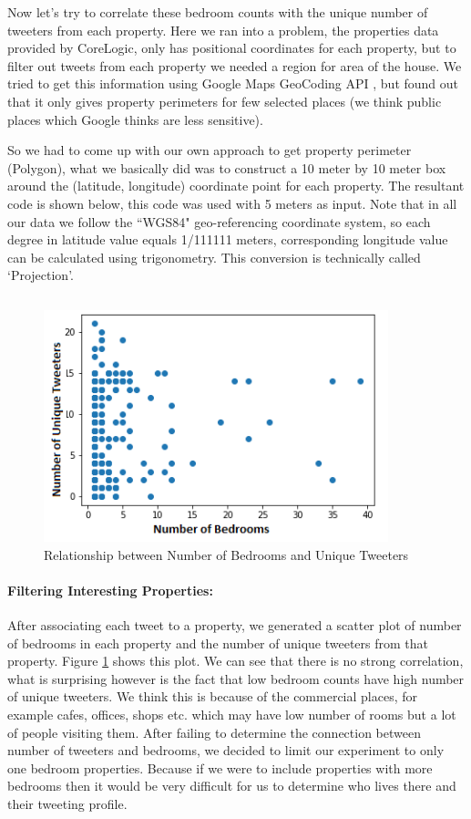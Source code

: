 \documentclass[12pt]{report}
\theoremstyle{named}
\begin{document}
Now let's try to correlate these bedroom counts with the unique number of tweeters from each property. Here we ran into a problem, the properties data provided by CoreLogic, only has positional coordinates for each property, but to filter out tweets from each property we needed a region for area of the house. We tried to get this information using Google Maps GeoCoding API \cite{GoogleGeoCodingAPI}, but found out that it only gives property perimeters for few selected places (we think public places which Google thinks are less sensitive). 

So we had to come up with our own approach to get property perimeter (Polygon), what we basically did was to construct a 10 meter by 10 meter box around the (latitude, longitude) coordinate point for each property. The resultant code is shown below, this code was used with 5 meters as input. Note that in all our data we follow the ``WGS84" geo-referencing coordinate system, so each degree in latitude value equals 1/111111 meters, corresponding longitude value can be calculated using trigonometry. This conversion is technically called `Projection'.

\inputminted{python}{pointToPolygon.py}



\begin{figure}[ht]
\centering
        \includegraphics[width=100mm,scale=1]{Images/BedroomVsTweeters.png}
    \caption{Relationship between Number of Bedrooms and Unique Tweeters}
    \label{fig:BedroomVSTweeters}
\end{figure}
\paragraph{Filtering Interesting Properties:\\}
After associating each tweet to a property, we generated a scatter plot of number of bedrooms in each property and the number of unique tweeters from that property. Figure \ref{fig:BedroomVSTweeters} shows this plot. We can see that there is no strong correlation, what is surprising however is the fact that low bedroom counts have high number of unique tweeters. We think this is because of the commercial places, for example cafes, offices, shops etc. which may have low number of rooms but a lot of people visiting them. 
After failing to determine the connection between number of tweeters and bedrooms, we decided to limit our experiment to only one bedroom properties. Because if we were to include properties with more bedrooms then it would be very difficult for us to determine who lives there and their tweeting profile.
\end{document}

